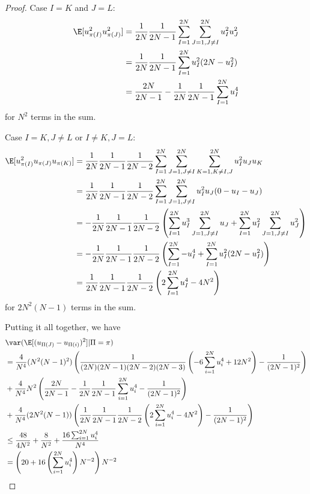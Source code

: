 \begin{proof}
  Case $I=K$ and $J=L$:
  \begin{align*}
    \E[u_{\pi(I)}^2 u_{\pi(J)}^2] &= \frac{1}{2N}\frac{1}{2N-1} \sum_{I=1}^{2N}
    \sum_{J=1, J\neq I}^{2N} u_{I}^2 u_{J}^2 \\
    &= \frac{1}{2N}\frac{1}{2N-1} \sum_{I=1}^{2N} u_{I}^2 (2N - u_{I}^2) \\
    &= \frac{2N}{2N-1}-\frac{1}{2N}\frac{1}{2N-1} \sum_{I=1}^{2N} u_{I}^4
  \end{align*}
  for $N^2$ terms in the sum.

  Case $I=K, J\neq L$ or $I\neq K, J= L$:
  \begin{align*}
    \E[u_{\pi(I)}^2 u_{\pi(J)} u_{\pi(K)}] &= \frac{1}{2N}\frac{1}{2N-1}\frac{1}{2N-2} \sum_{I=1}^{2N}
    \sum_{J=1, J\neq I}^{2N} \sum_{K=1, K \neq I,J}^{2N} u_{I}^2 u_{J} u_{K} \\
    &=\frac{1}{2N}\frac{1}{2N-1}\frac{1}{2N-2} \sum_{I=1}^{2N}
    \sum_{J=1, J\neq I}^{2N} u_{I}^2 u_{J} (0 - u_{I} - u_{J}) \\ 
    &=-\frac{1}{2N}\frac{1}{2N-1}\frac{1}{2N-2} \left(
      \sum_{I=1}^{2N} u_{I}^3 \sum_{J=1, J\neq I}^{2N} u_{J} +
      \sum_{I=1}^{2N} u_{I}^2 \sum_{J=1, J\neq I}^{2N} u_{J}^2
    \right ) \\
    &=-\frac{1}{2N}\frac{1}{2N-1}\frac{1}{2N-2} \left(
      \sum_{I=1}^{2N} - u_{I}^4 + 
      \sum_{I=1}^{2N} u_{I}^2 (2N - u_{I}^2)
    \right ) \\
    &=\frac{1}{2N}\frac{1}{2N-1}\frac{1}{2N-2} \left(
      2 \sum_{I=1}^{2N} u_{I}^4 -4N^2 \right )
  \end{align*}
  for $2N^2(N-1)$ terms in the sum.

  Putting it all together, we have 
  \begin{align*}
    &\var (\E[(u_{\Pi(J)}-u_{\Pi(i)})^2] | \Pi = \pi) \\
    &= \frac{4}{N^4} (N^2(N-1)^2)
    \left ( \frac{1}{(2N)(2N-1)(2N-2)(2N-3)} 
      \left ( -6\sum_{i=1}^{2N}u_{i}^4 + 12N^2 \right ) - \frac{1}{(2N-1)^2} \right ) \\
    &+ \frac{4}{N^4} N^2 \left ( \frac{2N}{2N-1} -
      \frac{1}{2N}\frac{1}{2N-1}\sum_{i=1}^{2N}u_{i}^4 - \frac{1}{(2N-1)^2}
    \right ) \\
    &+ \frac{4}{N^4} (2N^2(N-1)) \left ( 
      \frac{1}{2N}\frac{1}{2N-1}\frac{1}{2N-2}\left (
        2 \sum_{i=1}^{2N} u_{i}^4 - 4N^2 \right ) - \frac{1}{(2N-1)^2}
    \right ) \\
    &\leq \frac{48}{4N^2} + \frac{8}{N^2} + \frac{16 \sum_{i=1}^{2N}
      u_{i}^4}{N^4} \\
    &= \left ( 20 + 16 \left ( \sum_{i=1}^{2N} u_{i}^4 \right )N^{-2} \right ) N^{-2}
  \end{align*}
  

\end{proof}
